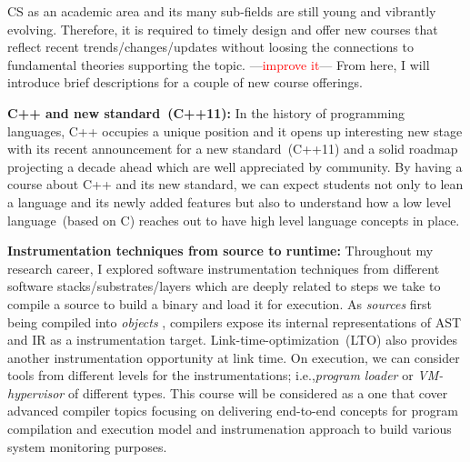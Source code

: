 \documentclass[letterpaper, 10pt]{article}
\newcommand{\jikk}[1]{{---\textcolor{red}{#1}---}}
\newcommand{\jikk}[1]{}
\def\ie{i.e.,\xspace}
\begin{document}
\begin{small}
CS as an academic area and its many sub-fields are still young and vibrantly
evolving. Therefore, it is required to timely design and offer new courses that
reflect recent trends/changes/updates without loosing the connections to
fundamental theories supporting the topic. \jikk{improve it} From here, I will
introduce brief descriptions for a couple of new course offerings.
%

{\bf C++ and new standard~(C++11):} In the history of programming languages, C++
occupies a unique position and it opens up interesting new stage with its
recent announcement for a new standard~(C++11) and a solid roadmap projecting a
decade ahead which are well appreciated by community.
%
%
By having a course about C++ and its new standard, we can expect students not
only to lean a language and its newly added features but also to understand how
a low level language~(based on C) reaches out to have high level language
concepts in place. 

{\bf Instrumentation techniques from source to runtime:} 
Throughout my research career, I explored software instrumentation techniques
from different software stacks/substrates/layers which are deeply related to
steps we take to compile a source to build a binary and load it for execution. 
%
As {\it sources} first being compiled into {\it objects} , compilers expose its
internal representations of AST and IR as a instrumentation target.
%
Link-time-optimization~(LTO) also provides another instrumentation opportunity
at link time. %
%
On execution, we can consider tools from different levels for the
instrumentations; \ie {\it program loader} or {\it VM-hypervisor} of different
types.
%
This course will be considered as a one that cover advanced compiler topics
focusing on delivering end-to-end concepts for program compilation and
execution model and instrumenation approach to build various system monitoring
purposes.


\end{small}
\end{document}
